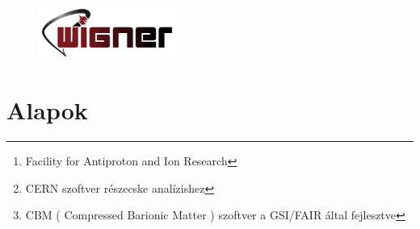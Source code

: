 \documentclass[a4paper,12pt]{article}
\begin{document}
\begin{figure}[H]
	\centering
	\includegraphics[width=0.4\textwidth]{wigner.png}
\end{figure}
\newpage
\renewcommand{\abstractname}{Kivonat}
\renewcommand{\thesection}{\Roman{section}.}
\renewcommand{\thesubsection}{\thesection\arabic{subsection}}
\renewcommand{\thesubsubsection}{\thesubsection\arabic{subsubsection}}
\begin{abstract}
	\par Egy hónapot töltöttem a nyár folyamán, július hónapba, Darmstadtban a GSI nevű kutatóközpontban. Kint tartózkodásom célja az volt, hogy többet megtudjam a  CBM saját szimulációjáról, amely kutató csoport már az épülő FAIR\footnote{ Facility for Antiproton and Ion Research } része. Ezalatt a hónap alatt megismerkedtem mélyebben a ROOT \footnote{ CERN szoftver részecske analízishez} nevű szoftverrel, a helyi cbmROOT-tal \footnote{ CBM ( Compressed Barionic Matter  ) szoftver a GSI/FAIR által fejlesztve}, valamint a C és C++ programozási nyelvekkel.
	\vspace{5mm}
	\par A kint létem alatt sokat tanultam a detektor technológiákról, valamint az azokban lejátszódó eseményekről és örömmel voltam részese ennek a nagyszabású projektnek és a mindennapi kutatói életnek.
	\vspace{5mm}
	\par Itthoni munkám során a nehézion ütközések szimulációjához kapcsolódva egy klaszterező program fejlesztésével foglalkoztam, 
	ami a kinyert adatokat csoportosítja térbeli és impulzustérbeli távolságuk alapján, előre definiált klaszterezési mérettel, az MST algoritmus felhasználása segítségével.
\end{abstract}
\tableofcontents
\newpage
\section{ Alapok}
\end{document}

